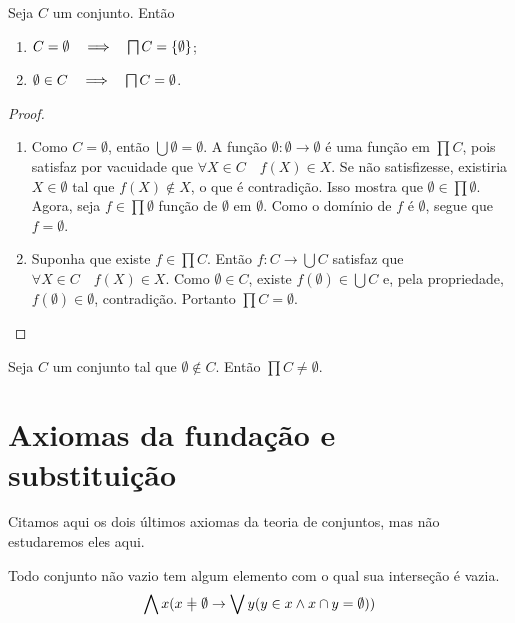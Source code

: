 \begin{proposition}
Seja $C$ um conjunto. Então
	\begin{enumerate}
	\item $C = \emptyset \entao \prod C = \{\emptyset\}$;
	\item $\emptyset \in C \entao \prod C = \emptyset$.
	\end{enumerate}
\end{proposition}
\begin{proof}
	\begin{enumerate}
	\item Como $C=\emptyset$, então $\bigcup \emptyset = \emptyset$. A função $\emptyset: \emptyset \to \emptyset$ é uma função em $\prod C$, pois satisfaz por vacuidade que $\forall X \in C \quad f(X) \in X$. Se não satisfizesse, existiria $X \in \emptyset$ tal que $f(X) \notin X$, o que é contradição. Isso mostra que $\emptyset \in \prod \emptyset$. Agora, seja $f \in \prod \emptyset$ função de $\emptyset$ em $\emptyset$. Como o domínio de $f$ é $\emptyset$, segue que $f=\emptyset$.
	
	\item Suponha que existe $f \in \prod C$. Então $f: C \to \bigcup C$ satisfaz que $\forall X \in C \quad f(X) \in X$. Como $\emptyset \in C$, existe $f(\emptyset) \in \bigcup C$ e, pela propriedade, $f(\emptyset) \in \emptyset$, contradição. Portanto $\prod C = \emptyset$.
	\end{enumerate}
\end{proof}

\begin{axiom}[Escolha]
Seja $C$ um conjunto tal que $\emptyset \notin C$. Então $\prod C \neq \emptyset$.
\end{axiom}


\section{Axiomas da fundação e substituição}

Citamos aqui os dois últimos axiomas da teoria de conjuntos, mas não estudaremos eles aqui.

\begin{axiom}[Fundação]
Todo conjunto não vazio tem algum elemento com o qual sua interseção é vazia.
	\begin{equation*}
	\forall x(x \neq \emptyset \limplica \exists y(y \in x \lee x \cap y = \emptyset))
	\end{equation*}
\end{axiom}


